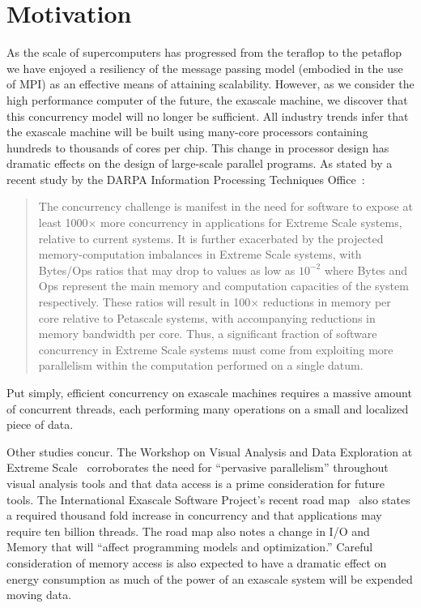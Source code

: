 \documentclass{vgtc}                          %
\newcommand*{\lcite}[1]{~\cite{#1}}
\begin{document}
\section{Motivation}
\label{sec:Motivation}


As the scale of supercomputers has progressed from the teraflop to the
petaflop we have enjoyed a resiliency of the message passing model
(embodied in the use of MPI) as an effective means of attaining
scalability.  However, as we consider the high performance computer of the
future, the exascale machine, we discover that this concurrency model will
no longer be sufficient.  All industry trends infer that the exascale
machine will be built using many-core processors containing hundreds to
thousands of cores per chip.  This change in processor design has dramatic
effects on the design of large-scale parallel programs.  As stated by a
recent study by the DARPA Information Processing Techniques
Office\lcite{DARPAExascaleStudy}:

\begin{quote}
  The concurrency challenge is manifest in the need for software to expose
  at least 1000$\times$ more concurrency in applications for Extreme Scale
  systems, relative to current systems. It is further exacerbated by the
  projected memory-computation imbalances in Extreme Scale systems, with
  Bytes/Ops ratios that may drop to values as low as $10^{-2}$ where Bytes
  and Ops represent the main memory and computation capacities of the
  system respectively. These ratios will result in 100$\times$ reductions
  in memory per core relative to Petascale systems, with accompanying
  reductions in memory bandwidth per core.  Thus, a significant fraction of
  software concurrency in Extreme Scale systems must come from exploiting
  more parallelism within the computation performed on a single datum.
\end{quote}

Put simply, efficient concurrency on exascale machines requires a massive
amount of concurrent threads, each performing many operations on a small
and localized piece of data.

Other studies concur.  The Workshop on Visual Analysis and Data Exploration
at Extreme Scale\lcite{VisAnalysisExtremeScale} corroborates the need for
``pervasive parallelism'' throughout visual analysis tools and that data
access is a prime consideration for future tools.  The International
Exascale Software Project's recent road map\lcite{ExascaleRoadMap} also
states a required thousand fold increase in concurrency and that
applications may require ten billion threads.  The road map also notes a
change in I/O and Memory that will ``affect programming models and
optimization.''  Careful consideration of memory access is also expected
to have a dramatic effect on energy consumption as much of the power of an
exascale system will be expended moving data.
\end{document}
